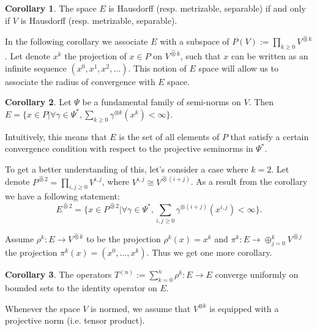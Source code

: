 \documentclass[12pt,a4paper]{report}
\theoremstyle{definition}
\newtheorem{corollary}{Corollary}
\begin{document}
\begin{corollary} %
	\label{2.4}
	The space $E$ is Hausdorff (resp. metrizable, separable) if and only if $V$ is Hausdorff (resp. metrizable, separable).
\end{corollary}

In the following corollary we associate $E$ with a subspace of $P(V):=\prod_{k\geq0}V^{\hat{\otimes}k} $. Let denote $x^k$ the projection of $x\in P$ on $V^{\hat{\otimes}k}$, such that $x$ can be written as an infinite sequence $(x^0 , x^1 , x^2 , ...)$. This notion of $E$ space will allow us to associate the radius of convergence with $E$ space.

\begin{corollary}\label{cor2.5}
	Let $\Psi$ be a fundamental family of semi-norms on $V$. Then $E = \{x \in P | \forall \gamma\in\Psi^* ,\sum_{k\geq0} \gamma^{\otimes k}(x^k)<\infty\}$.
\end{corollary}
Intuitively, this means that $E$ is the set of all elements of $P$ that satisfy a certain convergence condition with respect to the projective seminorms in $\Psi^*$.

To get a better understanding of this, let's consider a case where $k=2$. Let denote $P^{\hat{\otimes}2}=\prod_{i,j\geq 0}V^{i,j}$, where $V^{i,j}\cong V^{\hat{\otimes}(i+j)}$. As a result from the corollary we have a following statement:
\begin{equation}
	E^{\hat{\otimes}2}=\{x \in P^{\hat{\otimes}2}| \forall\gamma\in \Psi^*, \sum_{i,j\geq 0}\gamma^{\otimes(i+j)}(x^{i,j})<\infty \}.
\end{equation}




Assume $\rho^k:E\rightarrow V^{\hat{\otimes}k}$ to be the projection $\rho^k(x)=x^k$ and $\pi ^k: E \rightarrow \oplus^k_{j=0} V^{\hat{\otimes}j}$ the projection $\pi^k(x) = (x^0,..., x^k).$ Thus we get one more corollary.

\begin{corollary}\label{cor2.6}
	The operators $T^{(n)} := \sum_{k=0}^{n} \rho^k:E\rightarrow E $ converge uniformly on bounded sets to the identity operator on $E$.
\end{corollary}

Whenever the space $V$ is normed, we assume that $V^{\otimes k}$ is equipped with a projective norm (i.e. tensor product).
\end{document}
